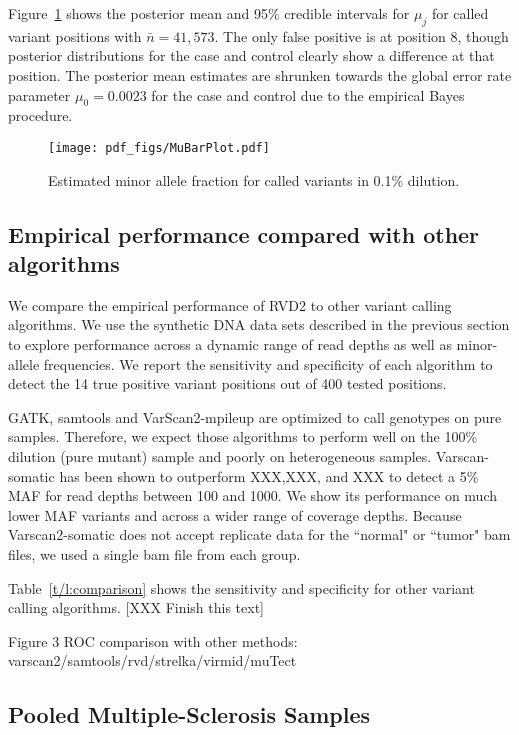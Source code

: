 \documentclass[11pt,reqno]{amsart}
\begin{document}
Figure~\ref{fig:MAF} shows the posterior mean and 95\% credible intervals for $\mu_j$ for called variant positions with $\bar{n} = 41,573$. The only false positive is at position 8, though posterior distributions for the case and control clearly show a difference at that position. The posterior mean estimates are shrunken towards the global error rate parameter $\mu_0 = 0.0023$ for the case and control due to the empirical Bayes procedure.

\begin{figure}[h]
\begin{center}
\texttt{[image: pdf\_figs/MuBarPlot.pdf]}
\caption{Estimated minor allele fraction for called variants in 0.1\% dilution.}
\label{fig:MAF}
\end{center}
\end{figure}


\subsection{Empirical performance compared with other algorithms}

We compare the empirical performance of RVD2 to other variant calling algorithms. We use the synthetic DNA data sets described in the previous section to explore performance across a dynamic range of read depths as well as minor-allele frequencies. We report the sensitivity and specificity of each algorithm to detect the 14 true positive variant positions out of 400 tested positions.

GATK, samtools and VarScan2-mpileup are optimized to call genotypes on pure samples. Therefore, we expect those algorithms to perform well on the 100\% dilution (pure mutant) sample and poorly on heterogeneous samples. Varscan-somatic has been shown to outperform XXX,XXX, and XXX to detect a 5\% MAF for read depths between 100 and 1000. We show its performance on much lower MAF variants and across a wider range of coverage depths. Because Varscan2-somatic does not accept replicate data for the ``normal" or ``tumor" bam files, we used a single bam file from each group.

Table~\ref{t/l:comparison} shows the sensitivity and specificity for other variant calling algorithms. 
[XXX Finish this text]



Figure 3 ROC comparison with other methods: varscan2/samtools/rvd/strelka/virmid/muTect


\subsection{Pooled Multiple-Sclerosis Samples}
\end{document}
